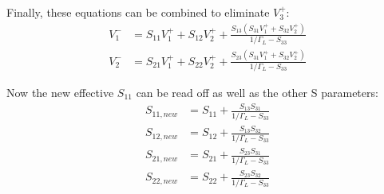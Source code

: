 \begin{enumerate}[label=(\alph*)]
    Finally, these equations can be combined to eliminate $V_3^+$:
    \begin{align*}
        V_1^- &= S_{11}V_1^+ + S_{12}V_2^+ + \frac{S_{13}(S_{31}V_1^+ + S_{32}V_2^+)}{1 / \Gamma_L-S_{33}} \\
        V_2^- &= S_{21}V_1^+ + S_{22}V_2^+ + \frac{S_{23}(S_{31}V_1^+ + S_{32}V_2^+)}{1 / \Gamma_L-S_{33}}
    \end{align*}

    Now the new effective $S_{11}$ can be read off as well as the other S parameters:
    \begin{align*}
        S_{11,new} &= S_{11} + \frac{S_{13}S_{31}}{1/\Gamma_L - S_{33}} \\
        S_{12,new} &= S_{12} + \frac{S_{13}S_{32}}{1/\Gamma_L - S_{33}} \\
        S_{21,new} &= S_{21} + \frac{S_{23}S_{31}}{1/\Gamma_L - S_{33}} \\
        S_{22,new} &= S_{22} + \frac{S_{23}S_{32}}{1/\Gamma_L - S_{33}}
    \end{align*}

\end{enumerate}

